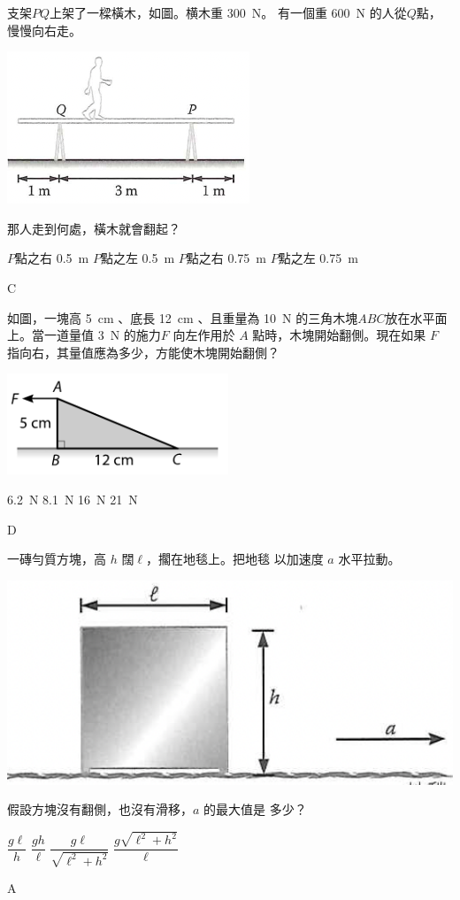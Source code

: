 
{
    支架$PQ$上架了一樑橫木，如圖。横木重 \qty{300}{N}。 有一個重 \qty{600}{N} 的人從$Q$點，慢慢向右走。\bigskip
    {\par\centering
        \includegraphics[width=.3\textwidth]{assets/efd30991.png}
        \par}\bigskip
    那人走到何處，橫木就會翻起？
    \begin{tasks}
        \task $P$點之右 \qty{0.5}{m}
        \task $P$點之左 \qty{0.5}{m}
        \task $P$點之右 \qty{0.75}{m}
        \task $P$點之左 \qty{0.75}{m}
    \end{tasks}
}{C}

{
    如圖，一塊高 \qty{5}{cm} 、底長 \qty{12}{cm} 、且重量為 \qty{10}{N} 的三角木塊$ABC$放在水平面上。當一道量值 \qty{3}{N} 的施力$F$ 向左作用於 $A$ 點時，木塊開始翻側。現在如果 $F$ 指向右，其量值應為多少，方能使木塊開始翻側？\bigskip
    {\par\centering
        \includegraphics[width=.3\textwidth]{assets/ad661d08.png}
        \par}\bigskip
    \begin{tasks}
        \task \qty{6.2}{N}
        \task \qty{8.1}{N}
        \task \qty{16}{N}
        \task \qty{21}{N}

    \end{tasks}
}{D}

{
    一磚勻質方塊，高 $h$ 闊$\ell$，擱在地毯上。把地毯 以加速度 $a$ 水平拉動。
    \bigskip
    {\par\centering
        \includegraphics[width=.3\textwidth]{assets/5b765e46.png}
        \par}\bigskip
    假設方塊沒有翻側，也沒有滑移，$a$ 的最大值是 多少？
    \begin{tasks}
        \task $\dfrac{g\ell}{h}$
        \task $\dfrac{gh}{\ell}$
        \task $\dfrac{g\ell}{\sqrt{\ell^2+h^2}}$
        \task $\dfrac{g\sqrt{\ell^2+h^2}}{\ell}$
    \end{tasks}
}{A}

